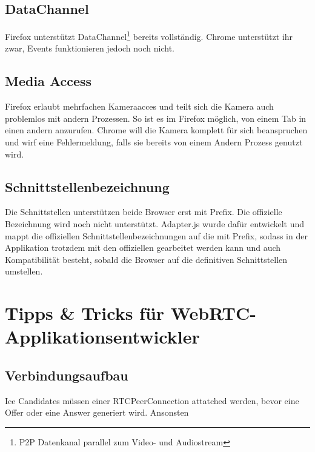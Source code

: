 		\subsection{DataChannel}
			Firefox unterstützt DataChannel\footnote{P2P Datenkanal parallel zum Video- und Audiostream} bereits vollständig. Chrome unterstützt ihr zwar, Events funktionieren jedoch noch nicht.
			
		\subsection{Media Access}
			Firefox erlaubt mehrfachen Kameraacces und teilt sich die Kamera auch problemlos mit andern Prozessen. So ist es im Firefox möglich, von einem Tab in einen andern anzurufen. Chrome will die Kamera komplett für sich beanspruchen und wirf eine Fehlermeldung, falls sie bereits von einem Andern Prozess genutzt wird.
			
		\subsection{Schnittstellenbezeichnung}
			Die Schnittstellen unterstützen beide Browser erst mit Prefix. Die offizielle Bezeichnung wird noch nicht unterstützt. Adapter.js wurde dafür entwickelt und mappt die offiziellen Schnittstellenbezeichnungen auf die mit Prefix, sodass in der Applikation trotzdem mit den offiziellen gearbeitet werden kann und auch Kompatibilität besteht, sobald die Browser auf die definitiven Schnittstellen umstellen.


	\section{Tipps \& Tricks für WebRTC-Applikationsentwickler}
		\subsection{Verbindungsaufbau}
			Ice Candidates müssen einer RTCPeerConnection attatched werden, bevor eine Offer oder eine Answer generiert wird. Ansonsten